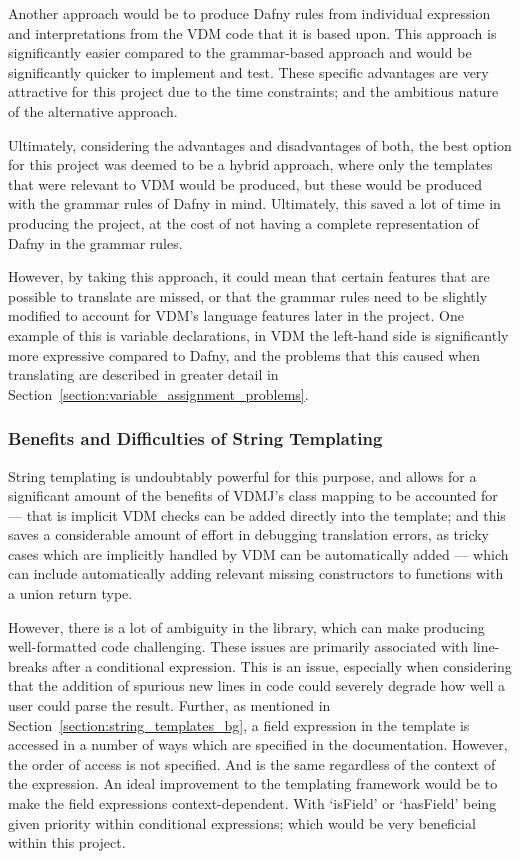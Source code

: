 \documentclass{entcs}
\begin{document}
Another approach would be to produce Dafny rules from individual expression and interpretations from the VDM code that it is based upon. This approach is significantly easier compared to the grammar-based approach and would be significantly quicker to implement and test. These specific advantages are very attractive for this project due to the time constraints; and the ambitious nature of the alternative approach. 

Ultimately, considering the advantages and disadvantages of both, the best option for this project was deemed to be a hybrid approach, where only the templates that were relevant to VDM would be produced, but these would be produced with the grammar rules of Dafny in mind. Ultimately, this saved a lot of time in producing the project, at the cost of not having a complete representation of Dafny in the grammar rules. 

However, by taking this approach, it could mean that certain features that are possible to translate are missed, or that the grammar rules need to be slightly modified to account for VDM's language features later in the project. One example of this is variable declarations, in VDM the left-hand side is significantly more expressive compared to Dafny, and the problems that this caused when translating are described in greater detail in Section~\ref{section:variable_assignment_problems}.

\subsubsection{Benefits and Difficulties of String Templating}

String templating is undoubtably powerful for this purpose, and allows for a significant amount of the benefits of VDMJ's class mapping to be accounted for --- that is implicit VDM checks can be added directly into the template; and this saves a considerable amount of effort in debugging translation errors, as tricky cases which are implicitly handled by VDM can be automatically added --- which can include automatically adding relevant missing constructors to functions with a union return type.

However, there is a lot of ambiguity in the library, which can make producing well-formatted code challenging. These issues are primarily associated with line-breaks after a conditional expression. This is an issue, especially when considering that the addition of spurious new lines in code could severely degrade how well a user could parse the result. Further, as mentioned in Section~\ref{section:string_templates_bg}, a field expression in the template is accessed in a number of ways which are specified in the documentation. However, the order of access is not specified. And is the same regardless of the context of the expression. An ideal improvement to the templating framework would be to make the field expressions context-dependent. With `isField' or `hasField' being given priority within conditional expressions; which would be very beneficial within this project.   
\end{document}
